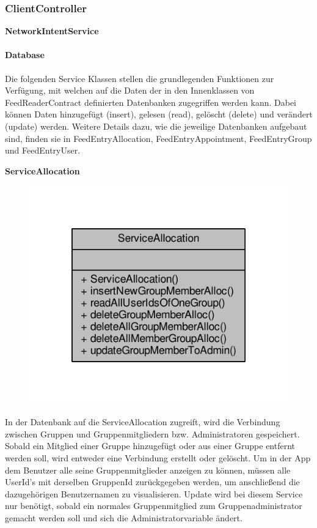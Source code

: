 \subsubsection{ClientController}

\textbf{NetworkIntentService}

\paragraph{Database}

Die folgenden Service Klassen stellen die grundlegenden Funktionen zur Verfügung, mit welchen auf die Daten der in den Innenklassen von FeedReaderContract definierten Datenbanken zugegriffen werden kann. Dabei können Daten hinzugefügt (insert), gelesen (read), gelöscht (delete) und verändert (update) werden.
Weitere Details dazu, wie die jeweilige Datenbanken aufgebaut sind, finden sie in FeedEntryAllocation, FeedEntryAppointment, FeedEntryGroup und FeedEntryUser.

\textbf{ServiceAllocation}
\begin{figure}[H]
	\includegraphics[scale = 1]{res/umlClasses/service_allocation__coll__graph.pdf} 
	\centering
\end{figure}
In der Datenbank auf die ServiceAllocation zugreift, wird die Verbindung zwischen Gruppen und Gruppenmitgliedern bzw. Administratoren gespeichert. 
Sobald ein Mitglied einer Gruppe hinzugefügt oder aus einer Gruppe entfernt werden soll, wird entweder eine Verbindung erstellt oder gelöscht. 
Um in der App dem Benutzer alle seine Gruppenmitglieder anzeigen zu können, müssen alle UserId's mit derselben GruppenId zurückgegeben werden, um anschließend die dazugehörigen Benutzernamen zu visualisieren.
Update wird bei diesem Service nur benötigt, sobald ein normales Gruppenmitglied zum Gruppenadministrator gemacht werden soll und sich die Administratorvariable ändert.
	
